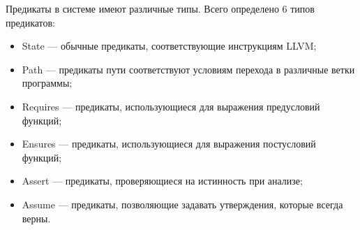 Предикаты в системе имеют различные типы. Всего определено 6 типов предикатов:
\begin{itemize}
\item State --- обычные предикаты, соответствующие инструкциям LLVM;
\item Path --- предикаты пути соответствуют условиям перехода в различные 
ветки программы;
\item Requires --- предикаты, использующиеся для выражения предусловий функций;
\item Ensures --- предикаты, использующиеся для выражения постусловий функций;
\item Assert --- предикаты, проверяющиеся на истинность при анализе;
\item Assume --- предикаты, позволяющие задавать утверждения, которые всегда верны.
\end{itemize}

